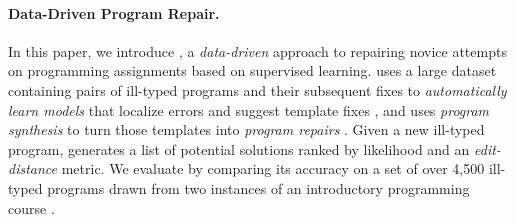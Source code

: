 \paragraph{Data-Driven Program Repair.}
In this paper, we introduce \toolname, a \emph{data-driven} approach to
repairing novice attempts on programming assignments based on supervised
learning. \toolname uses a large dataset containing pairs of ill-typed
programs  and
their subsequent fixes to \emph{automatically learn models} that localize
errors and suggest template fixes , and uses
\emph{program synthesis} to turn those
templates into \emph{program repairs} . Given a new ill-typed program, \toolname generates a list of
potential solutions ranked by likelihood and an \emph{edit-distance}
metric. We evaluate \toolname by comparing its accuracy on a set of over
4,500 ill-typed \ocaml programs drawn from two instances of an introductory
programming course .





